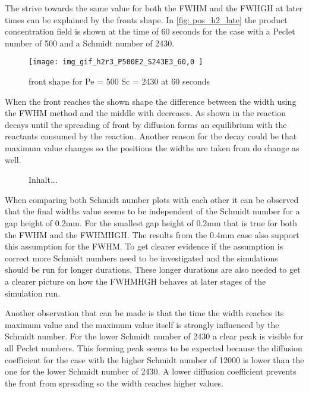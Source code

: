 \documentclass[../thesis.tex]{subfiles}
\begin{document}
The strive towards the same value for both the FWHM and the FWHGH at later times can be explained by the fronts shape. In \autoref{fig: pos_h2_late} the product concentration field is shown at the time of 60 seconds for the case with a Peclet number of 500 and a Schmidt number of 2430.
\begin{figure}[htb]
	\centering
	\texttt{[image: img\_gif\_h2r3\_P500E2\_S243E3\_60,0 ]}
	\caption{front shape for  Pe = 500 Sc = 2430 at 60 seconds}
	\label{fig: pos_h2_late}
\end{figure}
When the front reaches the shown shape the difference between the width using the FWHM method and the middle with decreases. As shown in \cite{comolli2021dynamics} the reaction decays until the spreading of front by diffusion forms an equilibrium with the reactants consumed by the reaction.
Another reason for the decay could be that maximum value changes so the positions the widths are taken from do change as well.

\begin{figure}
	Inhalt...
\end{figure}

When comparing both Schmidt number plots with each other it can be observed that the final widths value seems to be independent of the Schmidt number for a gap height of 0.2mm. For the smallest gap height of 0.2mm that is true for both the FWHM and the  FWHMHGH. The results from the 0.4mm case also support this assumption for the FWHM. To get clearer evidence if the assumption is correct more Schmidt numbers need to be investigated and the simulations should be run for longer durations. These longer durations are also needed to get a clearer picture on how the FWHMHGH behaves at later stages of the simulation run.

Another observation that can be made is that the time the width reaches its maximum value and the maximum value itself is strongly influenced by the Schmidt number. For the lower Schmidt number of 2430 a clear peak is visible for all Peclet numbers. This forming peak seems to be expected because the diffusion coefficient for the case with the higher Schmidt number of 12000 is lower than the one for the lower Schmidt number of 2430. A lower diffusion coefficient prevents the front from spreading so the width reaches higher values.
\newline
\end{document}
